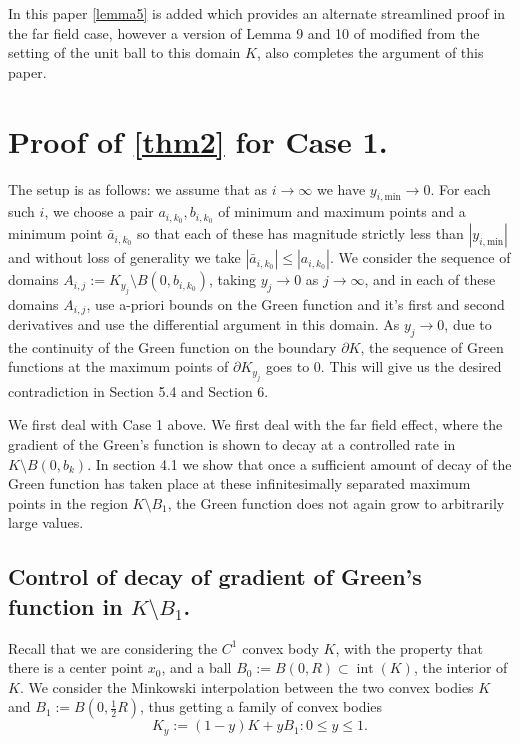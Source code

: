 \documentclass{article}
\newcounter{lem}
\theoremstyle{plain}
\theoremstyle{definition}
\theoremstyle{plain}
\begin{document}
  In this paper \cref{lemma5} is added which provides an alternate streamlined proof in the far field case, however a  version of Lemma 9 and 10 of \cite{Pat25}  modified from the setting of the unit ball to this domain $K$, also completes the argument of this paper.

 
\section{Proof of \cref{thm2} for Case 1.}
The setup is as follows: we assume that as $i\to \infty$ we have $y_{i,\text{min}}\to 0$. For each such $i$, we choose a pair $a_{i,k_0},b_{i,k_0}$ of minimum and maximum points and a minimum point $\bar{a}_{i,k_0}$ so that each of these has magnitude strictly less than $|y_{i,\text{min}}|$ and without loss of generality we take $|\bar{a}_{i,k_0}|\leq |a_{i,k_0}|$. We consider the sequence of domains $A_{i,j}:= K_{y_j}\setminus B(0,b_{i,k_0})$, taking $y_j \to 0$ as $j\to \infty$, and in each of these domains $A_{i,j}$, use a-priori bounds on the Green function and it's first and second derivatives and use the differential argument in this domain. As $y_j\to 0$, due to the continuity of the Green function on the boundary $\partial K$, the sequence of Green functions at the maximum points of $\partial K_{y_j}$ goes to $0$. This will give us the desired contradiction in Section 5.4 and Section 6.

We first deal with Case 1 above. We first deal with the far field effect, where the gradient of the Green's function is shown to decay at a controlled rate in $K\setminus B(0,b_k)$. In section 4.1 we show that once a sufficient amount of decay of the Green function has taken place at these infinitesimally separated maximum points in the region $K\setminus B_1$, the Green function does not again grow to arbitrarily large values.

\subsection{Control of decay of gradient of Green's function in $K\setminus B_1$.}




Recall that we are considering the $C^{1}$ convex body $K$, with the property that there is a center point $x_0$, and a ball $B_0 := B(0,R) \subset \operatorname{int}(K)$, the interior of $K$. We consider the Minkowski interpolation between the two convex bodies $K$ and $B_1 := B(0, \tfrac{1}{2}R)$, thus getting a family of convex bodies
\begin{equation}
 K_y := (1-y)K + y B_1 : 0 \le y \le 1 .
\end{equation}
\end{document}
